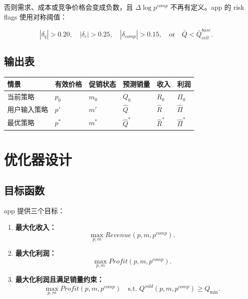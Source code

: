 \documentclass[UTF8,11pt,a4paper,fontset=none]{ctexart}
\begin{document}
否则需求、成本或竞争价格会变成负数，且 $\Delta\log p^{comp}$ 不再有定义。app 的 risk flags 使用对称阈值：

\begin{equation}
|\delta_q|>0.20,\quad |\delta_c|>0.25,\quad
|\delta_{comp}|>0.15,\quad \text{or}\quad
\bar Q < \bar Q^{base}_{cell}.
\end{equation}

\subsection{输出表}

\begin{tabularx}{\textwidth}{L{3.0cm}C{2.0cm}C{2.0cm}C{2.4cm}C{2.3cm}C{2.3cm}}
\toprule
情景 & 有效价格 & 促销状态 & 预测销量 & 收入 & 利润 \\
\midrule
当前策略 & $p_0$ & $m_0$ & $Q_0$ & $R_0$ & $\Pi_0$ \\
用户输入策略 & $p'$ & $m'$ & $\widehat{Q}$ & $\widehat{R}$ & $\widehat{\Pi}$ \\
最优策略 & $p^*$ & $m^*$ & $\widehat{Q}^*$ & $\widehat{R}^*$ & $\widehat{\Pi}^*$ \\
\bottomrule
\end{tabularx}

\section{优化器设计}

\subsection{目标函数}

app 提供三个目标：

\begin{enumerate}
  \item \textbf{最大化收入：}
  \begin{equation}
  \max_{p,m} Revenue(p,m,p^{comp}).
  \end{equation}
  \item \textbf{最大化利润：}
  \begin{equation}
  \max_{p,m} Profit(p,m,p^{comp}).
  \end{equation}
  \item \textbf{最大化利润且满足销量约束：}
  \begin{equation}
  \max_{p,m} Profit(p,m,p^{comp}) \quad \text{s.t. } Q^{sold}(p,m,p^{comp})\ge Q_{\min}.
  \end{equation}
\end{enumerate}
\end{document}
